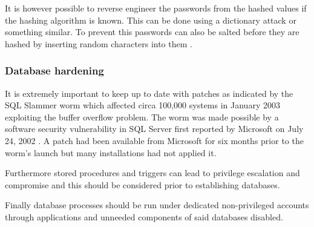 \documentclass[11pt, twocolumn]{article}
\begin{document}
It is however possible to reverse engineer the passwords from the hashed values if the hashing algorithm is known.  This can be done using a dictionary attack or something similar.  To prevent this passwords can also be salted before they are hashed by inserting random characters into them \cite{salt}.

\subsubsection{Database hardening}
It is extremely important to keep up to date with patches as indicated by the SQL Slammer worm which affected circa 100,000 systems in January 2003 exploiting the buffer overflow problem.  The worm was made possible by a software security vulnerability in SQL Server first reported by Microsoft on July 24, 2002 \cite{sql}.  A patch had been available from Microsoft for six months prior to the worm's launch but many installations had not applied it.

Furthermore stored procedures and triggers can lead to privilege escalation and compromise and this should be considered prior to establishing databases.

Finally database processes should be run under dedicated non-privileged accounts through applications and unneeded components of said databases disabled.
\end{document}
